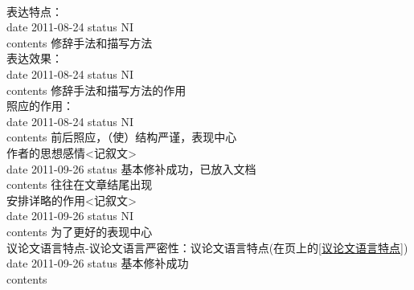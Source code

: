 \documentclass{article}
\newcommand{\superref}[1]{#1(在\pageref{#1}页上的\ref{#1})}
\newcommand{\hati}[4]{\\#1\\\colorbox{gray!25}{date #2 status #4}\\\colorbox{gray!50}{contents #3}}
\begin{document}
{{\begin{lrbox}{\contentofabstract}                  %
\begin{minipage}{\linewidth}                       %
\CC                                                %
\end{minipage}                                     %
\end{lrbox}                                        %
}{%
}}                          %

\newsavebox{\issue}
\begin{lrbox}{\issue}
\begin{minipage}{\linewidth}
\hati{表达特点：}{2011-08-24}{修辞手法和描写方法}{NI}
\hati{表达效果：}{2011-08-24}{修辞手法和描写方法的作用}{NI}
\hati{照应的作用：}{2011-08-24}{前后照应，（使）结构严谨，表现中心}{NI}
\hati{作者的思想感情<记叙文>}{2011-09-26}{往往在文章结尾出现}{基本修补成功，已放入文档}
\hati{安排详略的作用<记叙文>}{2011-09-26}{为了更好的表现中心}{NI}
\hati{议论文语言特点-议论文语言严密性：\superref{议论文语言特点}}{2011-09-26}{}{基本修补成功}
\end{minipage}
\end{lrbox}
\end{document}
